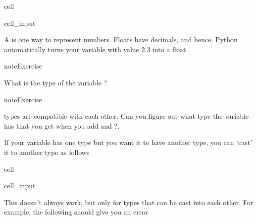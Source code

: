 \documentclass[letterpaper,10pt,english]{jupyterBook}
\begin{document}
\begin{sphinxuseclass}{cell}\begin{sphinxVerbatimInput}

\begin{sphinxuseclass}{cell_input}
\begin{sphinxVerbatim}[commandchars=\\\{\}]
\end{sphinxVerbatim}

\end{sphinxuseclass}\end{sphinxVerbatimInput}

\end{sphinxuseclass}
\sphinxAtStartPar
A  is one way to represent numbers. Floats have decimals, and hence, Python automatically turns your variable  with value 2.3 into a float.

\begin{sphinxadmonition}{note}{Exercise}

\sphinxAtStartPar
What is the type of the variable ?
\end{sphinxadmonition}

\begin{sphinxadmonition}{note}{Exercise}

\sphinxAtStartPar
types are compatible with each other. Can you figure out what type the variable has that you get when you add  and ?.
\end{sphinxadmonition}

\sphinxAtStartPar
If your variable has one type but you want it to have another type, you can ‘cast’ it to another type as follows

\begin{sphinxuseclass}{cell}\begin{sphinxVerbatimInput}

\begin{sphinxuseclass}{cell_input}
\begin{sphinxVerbatim}[commandchars=\\\{\}]
\end{sphinxVerbatim}

\end{sphinxuseclass}\end{sphinxVerbatimInput}

\end{sphinxuseclass}
\sphinxAtStartPar
This doesn’t always work, but only for types that can be cast into each other. For example, the following should give you an error
\end{document}
